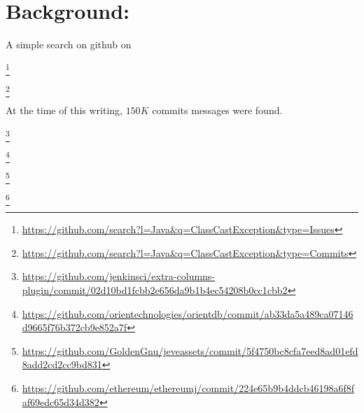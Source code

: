 
\chapter{Background: }

\label{cha:background}




A simple search on github on 

\footnote{\url{https://github.com/search?l=Java&q=ClassCastException&type=Issues}}

\footnote{\url{https://github.com/search?l=Java&q=ClassCastException&type=Commits}}

At the time of this writing, \circa{} $150K$ commits messages were found.

\footnote{\url{https://github.com/jenkinsci/extra-columns-plugin/commit/02d10bd1fcbb2e656da9b1b4ec54208b0cc1cbb2}}

\footnote{\url{https://github.com/orientechnologies/orientdb/commit/ab33da5a489ca07146d9665f76b372cb9e852a7f}}

\footnote{\url{https://github.com/GoldenGnu/jeveassets/commit/5f4750bc8cfa7eed8ad01efd8add2cd2cc9bd831}}

\footnote{\url{https://github.com/ethereum/ethereumj/commit/224e65b9b4ddcb46198a6f8faf69edc65d34d382}}

